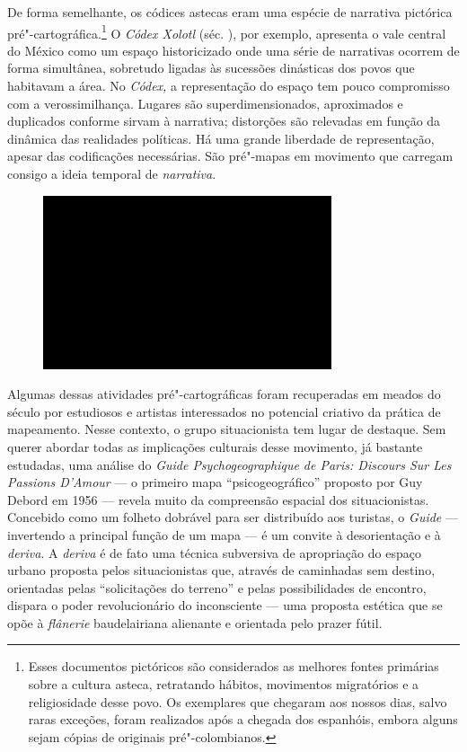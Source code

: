 De forma semelhante, os códices astecas eram uma espécie de narrativa
pictórica pré"-cartográfica.\footnote{Esses documentos pictóricos são
  considerados as melhores fontes primárias sobre a cultura asteca,
  retratando hábitos, movimentos migratórios e a religiosidade desse povo.
  Os exemplares que chegaram aos nossos dias, salvo raras exceções,
  foram realizados após a chegada dos espanhóis, embora alguns sejam
  cópias de originais pré"-colombianos.} O \emph{Códex Xolotl} (séc.
), por exemplo, apresenta o vale central do México como um espaço
historicizado onde uma série de narrativas ocorrem de forma simultânea,
sobretudo ligadas às sucessões dinásticas dos povos que habitavam a
área. No \emph{Códex,} a representação do espaço tem pouco compromisso
com a verossimilhança. Lugares são superdimensionados, aproximados e
duplicados conforme sirvam à narrativa; distorções são relevadas em
função da dinâmica das realidades políticas. Há uma grande liberdade de
representação, apesar das codificações necessárias. São pré"-mapas em
movimento que carregam consigo a ideia temporal de \emph{narrativa}.

\begin{figure}[!ht]
\centering
 \includegraphics[width=85mm]{./imgs/im1.jpg}
\caption{\tiny{}}
\end{figure}

Algumas dessas atividades pré"-cartográficas foram recuperadas em meados
do século  por estudiosos e artistas interessados no potencial
criativo da prática de mapeamento. Nesse contexto, o grupo situacionista
tem lugar de destaque. Sem querer abordar todas as implicações culturais
desse movimento, já bastante estudadas, uma análise do \emph{Guide
Psychogeographique de Paris: Discours Sur Les Passions D'Amour} --- o
primeiro mapa ``psicogeográfico'' proposto por Guy Debord em 1956 ---
revela muito da compreensão espacial dos situacionistas. Concebido como
um folheto dobrável para ser distribuído aos turistas, o \emph{Guide} ---
invertendo a principal função de um mapa --- é um convite à desorientação
e à \emph{deriva}. A \emph{deriva} é de fato uma técnica subversiva de
apropriação do espaço urbano proposta pelos situacionistas que, através
de caminhadas sem destino, orientadas pelas ``solicitações do terreno''
e pelas possibilidades de encontro, dispara o poder revolucionário do
inconsciente --- uma proposta estética que se opõe à \emph{flânerie}
baudelairiana alienante e orientada pelo prazer fútil.

